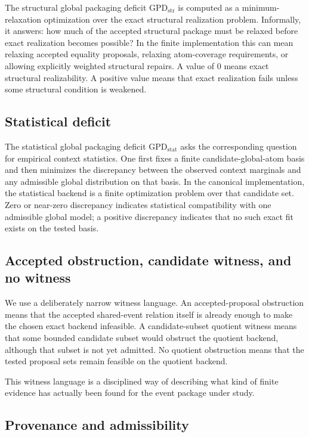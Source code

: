 \documentclass[11pt]{article}
\newcommand{\GPDstr}{\mathrm{GPD}_{\mathrm{str}}}
\newcommand{\GPDstat}{\mathrm{GPD}_{\mathrm{stat}}}
\theoremstyle{definition}
\begin{document}
The structural global packaging deficit \(\GPDstr\) is computed as a minimum-relaxation optimization over the exact structural realization problem. Informally, it answers: how much of the accepted structural package must be relaxed before exact realization becomes possible? In the finite implementation this can mean relaxing accepted equality proposals, relaxing atom-coverage requirements, or allowing explicitly weighted structural repairs. A value of \(0\) means exact structural realizability. A positive value means that exact realization fails unless some structural condition is weakened.

\subsection{Statistical deficit}

The statistical global packaging deficit \(\GPDstat\) asks the corresponding question for empirical context statistics. One first fixes a finite candidate-global-atom basis and then minimizes the discrepancy between the observed context marginals and any admissible global distribution on that basis. In the canonical implementation, the statistical backend is a finite optimization problem over that candidate set. Zero or near-zero discrepancy indicates statistical compatibility with one admissible global model; a positive discrepancy indicates that no such exact fit exists on the tested basis.

\subsection{Accepted obstruction, candidate witness, and no witness}

We use a deliberately narrow witness language. An accepted-proposal obstruction means that the accepted shared-event relation itself is already enough to make the chosen exact backend infeasible. A candidate-subset quotient witness means that some bounded candidate subset would obstruct the quotient backend, although that subset is not yet admitted. No quotient obstruction means that the tested proposal sets remain feasible on the quotient backend.

This witness language is a disciplined way of describing what kind of finite evidence has actually been found for the event package under study.

\subsection{Provenance and admissibility}
\end{document}
